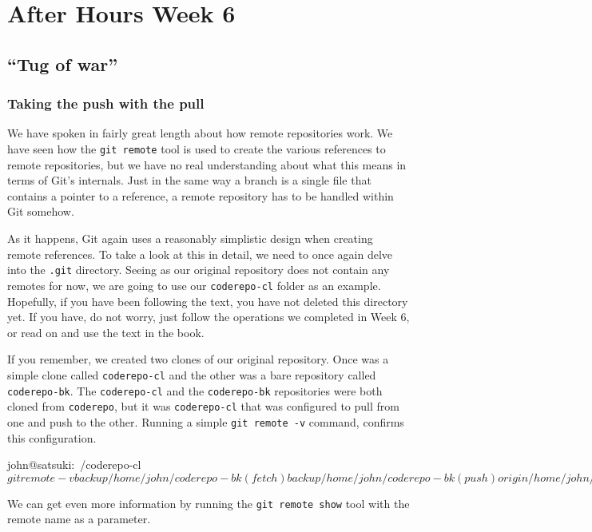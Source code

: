 \chapter{After Hours Week 6}
\section{``Tug of war''}
\subsection{Taking the push with the pull}

We have spoken in fairly great length about how remote repositories work.
We have seen how the \texttt{git remote} tool is used to create the various references to remote repositories, but we have no real understanding about what this means in terms of Git's internals.
Just in the same way a branch is a single file that contains a pointer to a reference, a remote repository has to be handled within Git somehow.

As it happens, Git again uses a reasonably simplistic design when creating remote references.
To take a look at this in detail, we need to once again delve into the \texttt{.git} directory.
Seeing as our original repository does not contain any remotes for now, we are going to use our \texttt{coderepo-cl} folder as an example.
Hopefully, if you have been following the text, you have not deleted this directory yet.
If you have, do not worry, just follow the operations we completed in Week 6, or read on and use the text in the book.

If you remember, we created two clones of our original repository.
Once was a simple clone called \texttt{coderepo-cl} and the other was a bare repository called \texttt{coderepo-bk}.
The \texttt{coderepo-cl} and the \texttt{coderepo-bk} repositories were both cloned from \texttt{coderepo}, but it was \texttt{coderepo-cl} that was configured to pull from one and push to the other.
Running a simple \texttt{git remote -v} command, confirms this configuration.

\begin{code}
john@satsuki:~/coderepo-cl$ git remote -v
backup	/home/john/coderepo-bk (fetch)
backup	/home/john/coderepo-bk (push)
origin	/home/john/coderepo (fetch)
origin	/home/john/coderepo (push)
john@satsuki:~/coderepo-cl$
\end{code}

We can get even more information by running the \texttt{git remote show} tool with the remote name as a parameter.

